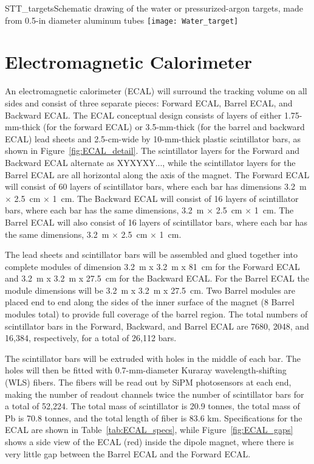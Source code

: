 \begin{cdrfigure}{STT_targets}{Schematic drawing of the water or pressurized-argon targets, 
made from 0.5-in diameter aluminum tubes}
\texttt{[image: Water\_target]}
\end{cdrfigure}

\section{Electromagnetic Calorimeter}
\label{sec:nd-nnd-emcalo}

An electromagnetic calorimeter 
(ECAL) will surround the tracking volume on all sides and consist of three separate pieces: Forward ECAL, Barrel ECAL, and Backward ECAL. 
The ECAL conceptual design 
consists of 
layers of either 1.75-mm-thick (for the forward ECAL) or 3.5-mm-thick 
(for the barrel and backward ECAL) lead sheets and 2.5-cm-wide by 10-mm-thick 
plastic scintillator bars,
as shown in Figure~\ref{fig:ECAL_detail}. The scintillator layers for the
Forward and Backward ECAL alternate as XYXYXY..., while the scintillator 
layers for the Barrel ECAL are all horizontal along the axis of the magnet.
The Forward ECAL will consist of 60 layers of scintillator bars, where each
bar has dimensions 3.2~m $\times$ 2.5~cm $\times$ 1~cm. The
Backward ECAL will consist of 16 layers of scintillator bars, where each 
bar has the same dimensions, 3.2~m $\times$ 2.5~cm $\times$ 1~cm. The Barrel ECAL will also consist 
of 16 layers of scintillator bars, where each bar has the same dimensions, 
3.2~m $\times$ 2.5~cm $\times$ 1~cm. 

The lead sheets and scintillator bars will be assembled and glued together
into complete modules of dimension 3.2~m x 3.2~m x 81~cm for the Forward ECAL and
3.2~m x 3.2~m x 27.5~cm for the Backward ECAL. For the Barrel ECAL the module 
dimensions will be 3.2~m x 3.2~m x 27.5~cm. Two Barrel modules are placed end to
end along the sides of the inner surface of the magnet (8 Barrel modules
total) to provide full coverage of the barrel region.
The total numbers of scintillator bars in the
Forward, Backward, and Barrel ECAL are 7680, 2048, and 16,384, respectively, 
for a total of 26,112 bars. 

The scintillator bars will be extruded with 
holes in the middle of each bar. The
holes will then be fitted with 0.7-mm-diameter Kuraray wavelength-shifting (WLS) fibers.
The fibers will be read out by SiPM photosensors at each end, making the number of 
readout channels twice the number of scintillator bars 
for a total of 52,224. The total mass of scintillator is 20.9 tonnes, 
the total mass of Pb is 70.8 tonnes, and
the total length of fiber is 83.6 km.
Specifications for the ECAL are shown in Table~\ref{tab:ECAL_specs}, while 
Figure~\ref{fig:ECAL_gaps} shows a side view of the ECAL (red) inside the dipole
magnet, where there is very little gap between the Barrel ECAL and the Forward ECAL.


